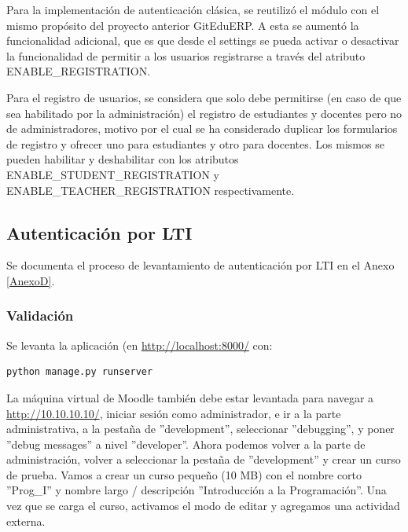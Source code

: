 Para la implementación de autenticación clásica, se reutilizó el módulo con el mismo propósito del proyecto anterior GitEduERP. A esta se aumentó la funcionalidad adicional, que es que desde el settings se pueda activar o desactivar la funcionalidad de permitir a los usuarios registrarse a través del atributo ENABLE\_REGISTRATION. 

Para el registro de usuarios, se considera que solo debe permitirse (en caso de que sea habilitado por la administración) el registro de estudiantes y docentes pero no de administradores, motivo por el cual se ha considerado duplicar los formularios de registro y ofrecer uno para estudiantes y otro para docentes. Los mismos se pueden habilitar y deshabilitar con los atributos ENABLE\_STUDENT\_REGISTRATION y ENABLE\_TEACHER\_REGISTRATION respectivamente.

\subsection{Autenticación por LTI}
Se documenta el proceso de levantamiento de autenticación por LTI en el Anexo \ref{AnexoD}.

\subsubsection{Validación}

Se levanta la aplicación (en \url{http://localhost:8000/} con:
\begin{lstlisting}
python manage.py runserver
\end{lstlisting}
La máquina virtual de Moodle también debe estar levantada para navegar a \url{http://10.10.10.10/}, iniciar sesión como administrador, e ir a la parte administrativa, a la pestaña de ''development'', seleccionar ''debugging'', y poner ''debug messages'' a nivel ''developer''. Ahora podemos volver a la parte de administración, volver a seleccionar la pestaña de ''development'' y crear un curso de prueba. Vamos a crear un curso pequeño (10 MB) con el nombre corto ''Prog\_I'' y nombre largo / descripción ''Introducción a la Programación''. Una vez que se carga el curso, activamos el modo de editar y agregamos una actividad externa.

